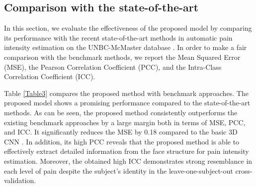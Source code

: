 \documentclass[a4paper,conference]{IEEEtran}
\begin{document}
\subsection{Comparison with the state-of-the-art}
In this section, we evaluate the effectiveness of the proposed model by comparing its performance with the recent state-of-the-art methods in automatic pain intensity estimation on the UNBC-McMaster database \cite{c1}. In order to make a fair comparison with the benchmark methods, we report the Mean Squared Error (MSE), the Pearson Correlation Coefficient (PCC), and the Intra-Class Correlation Coefficient (ICC). 

Table \ref{Table3} compares the proposed method with benchmark approaches.  The proposed model shows a promising performance compared to the state-of-the-art methods. As can be seen, the proposed method consistently outperforms the existing benchmark approaches by a large margin both in terms of MSE, PCC, and ICC. It significantly reduces the MSE by 0.18 compared to the basic 3D CNN \cite{c15}. In addition, its high PCC reveals that the proposed method is able to effectively extract detailed information from the face structure for pain intensity estimation. Moreover, the obtained high ICC demonstrates strong resemblance in each level of pain despite the subject's identity in the leave-one-subject-out cross-validation. 
\end{document}
